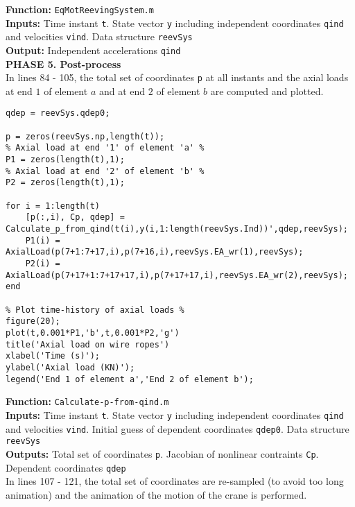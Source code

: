 \setlength{\parindent}{0cm}
\textbf{Function:} \texttt{EqMotReevingSystem.m} \\
\textbf{Inputs:} Time instant \texttt{t}. State vector \texttt{y} including independent coordinates \texttt{qind} and velocities \texttt{vind}. Data structure \texttt{reevSys} \\
\textbf{Output:} Independent accelerations \texttt{qind} \\

\textbf{PHASE 5. Post-process} \\

In lines 84 - 105, the total set of coordinates \texttt{p} at all instants and the axial loads at end $1$ of element $a$ and at end $2$ of element $b$ are computed and plotted. 

\begin{tcolorbox}{\begin{lstlisting}[style=Matlab-editor]
% Calculation of all coordinates all instants %
qdep = reevSys.qdep0;

p = zeros(reevSys.np,length(t));
% Axial load at end '1' of element 'a' %
P1 = zeros(length(t),1);
% Axial load at end '2' of element 'b' %
P2 = zeros(length(t),1);

for i = 1:length(t)
    [p(:,i), Cp, qdep] = Calculate_p_from_qind(t(i),y(i,1:length(reevSys.Ind))',qdep,reevSys);
    P1(i) = AxialLoad(p(7+1:7+17,i),p(7+16,i),reevSys.EA_wr(1),reevSys); 
    P2(i) = AxialLoad(p(7+17+1:7+17+17,i),p(7+17+17,i),reevSys.EA_wr(2),reevSys); 
end

% Plot time-history of axial loads %
figure(20);
plot(t,0.001*P1,'b',t,0.001*P2,'g')
title('Axial load on wire ropes')
xlabel('Time (s)');
ylabel('Axial load (KN)');
legend('End 1 of element a','End 2 of element b');
\end{lstlisting}}
\end{tcolorbox}

\setlength{\parindent}{0cm}
\textbf{Function:} \texttt{Calculate-p-from-qind.m} \\
\textbf{Inputs:} Time instant \texttt{t}. State vector \texttt{y} including independent coordinates \texttt{qind} and velocities \texttt{vind}. Initial guess of dependent coordinates \texttt{qdep0}. Data structure \texttt{reevSys} \\
\textbf{Outputs:} Total set of coordinates \texttt{p}. Jacobian of nonlinear contraints \texttt{Cp}. Dependent coordinates \texttt{qdep} \\

In lines 107 - 121, the total set of coordinates are re-sampled (to avoid too long animation) and the animation of the motion of the crane is performed.


